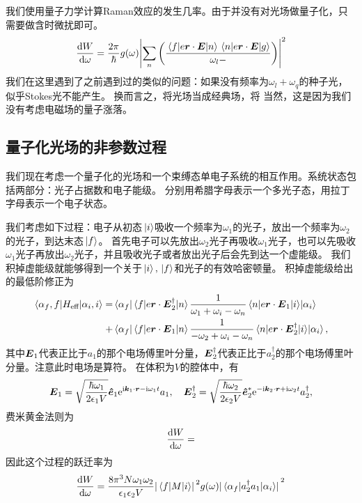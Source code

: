 我们使用量子力学计算Raman效应的发生几率。由于并没有对光场做量子化，只需要做含时微扰即可。
\[
    \dv{W}{\omega} = \frac{2\pi}{\hbar} g(\omega) \abs{\sum_n \left(
        \frac{\mel*{f}{e \vb*{r} \cdot \vb*{E}}{n} \mel*{n}{e \vb*{r} \cdot \vb*{E}}{g}}{\omega_l - }
    \right)}^2
\]
我们在这里遇到了之前遇到过的类似的问题：如果没有频率为$\omega_l + \omega_q$的种子光，似乎Stokes光不能产生。
换而言之，将光场当成经典场，将
当然，这是因为我们没有考虑电磁场的量子涨落。

\subsection{量子化光场的非参数过程}

我们现在考虑一个量子化的光场和一个束缚态单电子系统的相互作用。系统状态包括两部分：光子占据数和电子能级。
分别用希腊字母表示一个多光子态，用拉丁字母表示一个电子状态。

我们考虑如下过程：电子从初态$\ket*{i}$吸收一个频率为$\omega_1$的光子，放出一个频率为$\omega_2$的光子，到达末态$\ket*{f}$。
首先电子可以先放出$\omega_2$光子再吸收$\omega_1$光子，也可以先吸收$\omega_1$光子再放出$\omega_2$光子，并且吸收光子或者放出光子后会先到达一个虚能级。
我们积掉虚能级就能够得到一个关于$\ket*{i}, \ket*{f}$和光子的有效哈密顿量。
积掉虚能级给出的最低阶修正为
\begin{equation}
    \begin{aligned}
        \mel*{\alpha_f, f}{H_\text{eff}}{\alpha_i, i} = &\mel*{\alpha_f}{\mel{f}{e \vb*{r} \cdot \vb*{E}_2^\dagger}{n} \frac{1}{\omega_1 + \omega_i - \omega_n} \mel*{n}{e \vb*{r} \cdot \vb*{E}_1}{i}}{\alpha_i} \\
        + &\mel*{\alpha_f}{\mel{f}{e \vb*{r} \cdot \vb*{E}_1}{n} \frac{1}{- \omega_2 + \omega_i - \omega_n} \mel*{n}{e \vb*{r} \cdot \vb*{E}_2^\dagger}{i}}{\alpha_i},
    \end{aligned}
\end{equation}
其中$\vb*{E}_1$代表正比于$a_1$的那个电场傅里叶分量，$\vb*{E}_2^\dagger$代表正比于$a_2^\dagger$的那个电场傅里叶分量。注意此时电场是算符。
在体积为$V$的腔体中，有
\begin{equation}
    \vb*{E}_1 = \sqrt{\frac{\hbar \omega_1}{2 \epsilon_1 V}} \vu*{e}_1 \mathrm{e}^{\mathrm{i} \vb*{k}_1 \cdot \vb*{r} - \mathrm{i} \omega_1 t} a_1, \quad \vb*{E}_2^\dagger = \sqrt{\frac{\hbar \omega_2}{2 \epsilon_2 V}} \vu*{e}_2^* \mathrm{e}^{- \mathrm{i} \vb*{k}_2 \cdot \vb*{r} + \mathrm{i} \omega_2 t} a^\dagger_2,
\end{equation}
费米黄金法则为
\[
    \dv{W}{\omega} = 
\]
因此这个过程的跃迁率为
\begin{equation}
    \dv{W}{\omega} = \frac{8\pi^3 N \omega_1 \omega_2}{\epsilon_1 \epsilon_2 V} \abs*{\mel{f}{M}{i}}^2 g(\omega) \abs*{\mel*{\alpha_f}{a_2^\dagger a_1}{\alpha_i}}^2
\end{equation}

